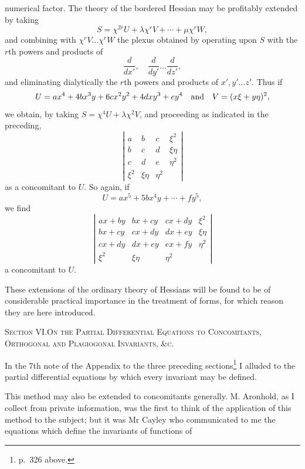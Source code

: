 \documentclass[11pt]{article}
\newcommand{\subpaperhead}[1]{\begin{center}{\large\scshape #1}\end{center}}
\newcommand{\sourcepage}[1]{\marginpar{\scriptsize p.~#1}}
\begin{document}
{{\sourcepage{351}
numerical factor. The theory of the bordered Hessian may be profitably extended by taking
\[
S=\chi^{2r}U+\lambda\chi^rV+\cdots+\mu\chi^rW,
\]
and combining with $\chi^rV\ldots\chi^rW$ the plexus obtained by operating upon $S$ with the $r$th powers and products of
\[
\frac{d}{dx'},\quad \frac{d}{dy'}\ldots \frac{d}{dz'},
\]
and eliminating dialytically the $r$th powers and products of $x',y'\ldots z'$. Thus if
\[
U=ax^4+4bx^3y+6cx^2y^2+4dxy^3+ey^4
\quad\hbox{and}\quad
V=(x\xi+y\eta)^2,
\]
we obtain, by taking $S=\chi^4U+\lambda\chi^2V$, and proceeding as indicated in the preceding,
\[
\left|\begin{array}{cccc}
a&b&c&\xi^2\\
b&c&d&\xi\eta\\
c&d&e&\eta^2\\
\xi^2&\xi\eta&\eta^2&
\end{array}\right|
\]
as a concomitant to $U$. So again, if
\[
U=ax^5+5bx^4y+\cdots+fy^5,
\]
we find
\[
\left|\begin{array}{cccc}
ax+by&bx+cy&cx+dy&\xi^2\\
bx+cy&cx+dy&dx+ey&\xi\eta\\
cx+dy&dx+ey&ex+fy&\eta^2\\
\xi^2&\xi\eta&\eta^2&
\end{array}\right|
\]
a concomitant to $U$.

These extensions of the ordinary theory of Hessians will be found to be of considerable practical importance in the treatment of forms, for which reason they are here introduced.

\subpaperhead{Section VI.\quad On the Partial Differential Equations to Concomitants,\\ Orthogonal and Plagiogonal Invariants, \&c.}

In the 7th note of the Appendix to the three preceding sections\footnote{p.~326 above.} I alluded to the partial differential equations by which every invariant may be defined.

This method may also be extended to concomitants generally. M. Aronhold, as I collect from private information, was the first to think of the application of this method to the subject; but it was Mr Cayley who communicated to me the equations which define the invariants of functions of

}}
\end{document}
